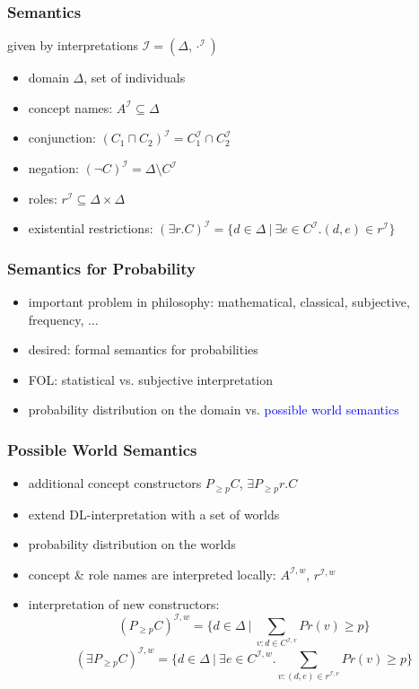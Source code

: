 \documentclass[draft]{beamer}
\newcommand{\I}{\ensuremath{\mathcal{I}}\xspace}
\renewcommand{\emph}[1]{\textcolor{blue}{#1}}
\begin{document}
\begin{frame}
	\frametitle{Semantics}
	given by interpretations $\I=(\Delta,\cdot^{\I})$
	\begin{itemize}
		\item domain $\Delta$, set of individuals
		\item concept names: $A^{\I}\subseteq\Delta$
		\item conjunction: $(C_1\sqcap C_2)^{\I}=C_1^{\I}\cap C_2^{\I}$
		\item negation: $(\neg C)^{\I}=\Delta\setminus C^{\I}$
		\item roles: $r^{\I}\subseteq\Delta\times\Delta$
		\item existential restrictions: $(\exists r.C)^{\I}=\{d\in\Delta~|~\exists e\in C^{\I}.(d,e)\in r^{\I}\}$
	\end{itemize}
\end{frame}


\begin{frame}
	\frametitle{Semantics for Probability}
	\begin{itemize}
		\item important problem in philosophy: mathematical, classical, subjective, frequency, $\ldots$
		\item desired: formal semantics for probabilities
		\item FOL: statistical vs. subjective interpretation \cite{halpern}
		\item probability distribution on the domain vs. \emph{possible world semantics}
	\end{itemize}
\end{frame}


\begin{frame}
	\frametitle{Possible World Semantics}
	\begin{itemize}
		\item additional concept constructors $P_{\geq p}C$, $\exists P_{\geq p}r.C$
		\item extend DL-interpretation with a set of worlds
		\item probability distribution on the worlds %
		\item concept \& role names are interpreted locally: $A^{\I,w}$, $r^{\I,w}$
		\item interpretation of new constructors:
			$$(P_{\geq p}C)^{\I,w}=\{d\in\Delta~|~\sum_{v:d\in C^{\I,v}}Pr(v)\geq p\}$$
			$$(\exists P_{\geq p}C)^{\I,w}=\{d\in\Delta~|~\exists e\in C^{\I,w}.\sum_{v:(d,e)\in r^{\I,v}}Pr(v)\geq p\}$$
	\end{itemize}
\end{frame}
\end{document}
